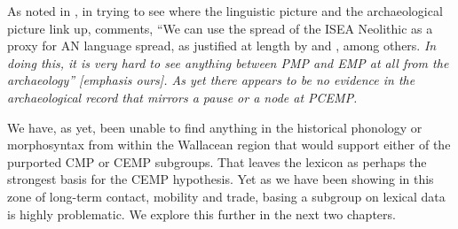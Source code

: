 As noted in ,
in trying to see where the linguistic picture
and the archaeological picture link up,
\citet[511]{Spriggs2011} comments, “We can use the spread of
the ISEA Neolithic as a proxy for AN language spread,
as justified at length by \citet{Pawley2004}
and \citet{Ross2008}, among others.
\it{In doing this, it is very hard to see anything between PMP
and EMP at all from the archaeology}” [emphasis ours].
As yet there appears to be no evidence in the archaeological
record that mirrors a pause or a node at PCEMP.

We have, as yet,
been unable to find anything in the historical phonology or morphosyntax
from within the Wallacean region that would support either of
the purported CMP or CEMP subgroups.
That leaves the lexicon as perhaps the strongest basis for the CEMP hypothesis.
Yet as we have been showing in this zone of long-term contact,
mobility and trade, basing a subgroup on lexical data is highly problematic.
We explore this further in the next two chapters.